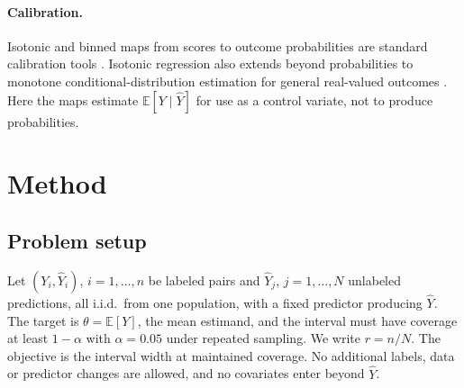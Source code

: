 \documentclass{article}
\newcommand{\Yhat}{\hat Y}
\newcommand{\E}{\mathbb{E}}
\begin{document}
\paragraph{Calibration.} Isotonic and binned maps from scores to outcome probabilities are standard calibration tools \citep{Zadrozny2002TransformingCS,Niculescu-Mizil2005PredictingGP}. Isotonic regression also extends beyond probabilities to monotone conditional-distribution estimation for general real-valued outcomes \citep{Henzi2021Isotonic}. Here the maps estimate $\E[Y\mid \Yhat]$ for use as a control variate, not to produce probabilities.

\section{Method}\label{sec:method}
\subsection{Problem setup}
Let $(Y_i,\Yhat_i)$, $i=1,\dots,n$ be labeled pairs and $\Yhat_j$, $j=1,\dots,N$ unlabeled predictions, all i.i.d.\ from one population, with a fixed predictor producing $\Yhat$. The target is $\theta=\E[Y]$, the mean estimand, and the interval must have coverage at least $1-\alpha$ with $\alpha=0.05$ under repeated sampling. We write $r=n/N$. The objective is the interval width at maintained coverage. No additional labels, data or predictor changes are allowed, and no covariates enter beyond $\Yhat$.
\end{document}
